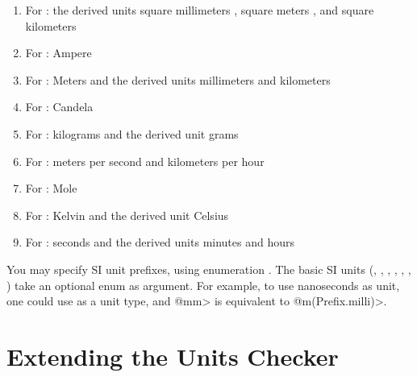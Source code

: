 \begin{enumerate}
\item For :
  the derived units
  square millimeters ,
  square meters , and
  square kilometers 

\item For :
  Ampere 

\item For :
  Meters 
  and the derived units
  millimeters  and
  kilometers 

\item For :
  Candela 

\item For :
  kilograms 
  and the derived unit
  grams 

\item For :
  meters per second  and
  kilometers per hour 

\item For :
  Mole 

\item For :
  Kelvin 
  and the derived unit
  Celsius 

\item For :
  seconds 
  and the derived units
  minutes  and
  hours 
\end{enumerate}


You may specify SI unit prefixes, using enumeration .
The basic SI units
(, , , , ,
 , )
take an optional  enum as argument.
For example, to use nanoseconds as unit, one could use
 as a unit type, and \<@mm> is equivalent to
\<@m(Prefix.milli)>.



\section{Extending the Units Checker\label{extending-units}}

